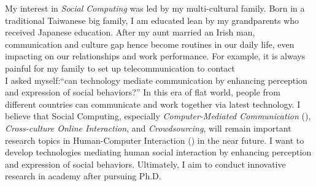 \noindent 
My interest in \textit{Social Computing} was led by my multi-cultural family.
Born in a traditional Taiwanese big family,
I am educated lean by my grandparents who received Japanese education.
After my aunt married an Irish man, 
communication and culture gap hence become routines in our daily life, 
even impacting on our relationships and work performance.
For example,
it is always painful for my family to set up telecommunication to contact \\

\noindent
I asked myself:``can technology mediate communication by enhancing perception and expression of social behaviors?''
In this era of flat world, people from different countries can communicate and work together via latest technology.
I believe that Social Computing, 
especially \textit{Computer-Mediated Communication} (), \textit{Cross-culture Online Interaction}, and \textit{Crowdsourcing},
will remain important research topics in Human-Computer Interaction () in the near future.
I want to develop technologies mediating human social interaction by enhancing perception and expression of social behaviors.
Ultimately, I aim to conduct innovative research in academy after pursuing Ph.D.\\

